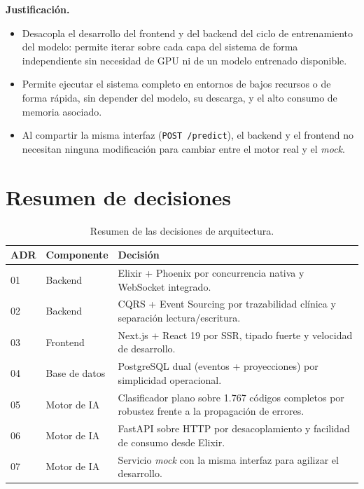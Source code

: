 \textbf{Justificación.}
\begin{itemize}
    \item Desacopla el desarrollo del frontend y del backend del ciclo de entrenamiento del modelo: permite iterar sobre cada capa del sistema de forma independiente sin necesidad de GPU ni de un modelo entrenado disponible.
    \item Permite ejecutar el sistema completo en entornos de bajos recursos o de forma rápida, sin depender del modelo, su descarga, y el alto consumo de memoria asociado.
    \item Al compartir la misma interfaz (\texttt{POST /predict}), el backend y el frontend no necesitan ninguna modificación para cambiar entre el motor real y el \emph{mock}.
\end{itemize}

\section{Resumen de decisiones}

\begin{table}[h]
\centering
\caption{Resumen de las decisiones de arquitectura.}
\label{tab:adr-resumen}
\begin{tabular}{llp{7cm}}
\hline
\textbf{ADR} & \textbf{Componente} & \textbf{Decisión} \\
\hline
01 & Backend       & Elixir + Phoenix por concurrencia nativa y WebSocket integrado. \\
02 & Backend       & CQRS + Event Sourcing por trazabilidad clínica y separación lectura/escritura. \\
03 & Frontend      & Next.js + React 19 por SSR, tipado fuerte y velocidad de desarrollo. \\
04 & Base de datos & PostgreSQL dual (eventos + proyecciones) por simplicidad operacional. \\
05 & Motor de IA   & Clasificador plano sobre 1.767 códigos completos por robustez frente a la propagación de errores. \\
06 & Motor de IA   & FastAPI sobre HTTP por desacoplamiento y facilidad de consumo desde Elixir. \\
07 & Motor de IA   & Servicio \emph{mock} con la misma interfaz para agilizar el desarrollo. \\
\hline
\end{tabular}
\end{table}
